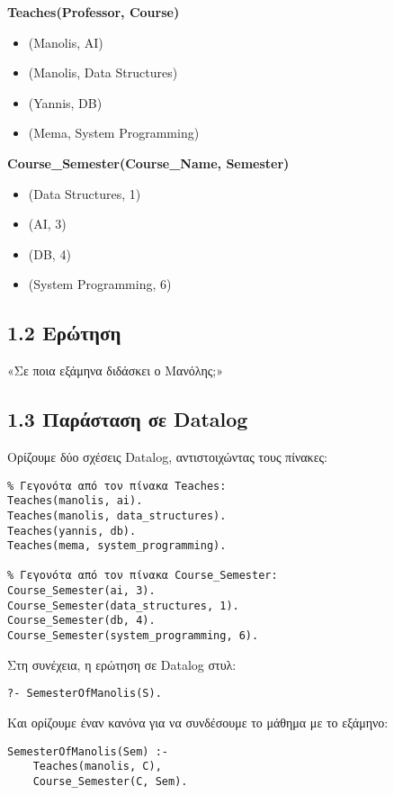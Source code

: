 \documentclass[a4paper,12pt]{article}
\begin{document}
\noindent
\textbf{Teaches(Professor, Course)} \\
\begin{itemize}
    \item (Manolis, AI)
    \item (Manolis, Data Structures)
    \item (Yannis, DB)
    \item (Mema, System Programming)
\end{itemize}

\noindent
\textbf{Course\_Semester(Course\_Name, Semester)} \\
\begin{itemize}
    \item (Data Structures, 1)
    \item (AI, 3)
    \item (DB, 4)
    \item (System Programming, 6)
\end{itemize}

\subsection*{1.2 Ερώτηση}

«Σε ποια εξάμηνα διδάσκει ο Μανόλης;»

\subsection*{1.3 Παράσταση σε Datalog}

Ορίζουμε δύο σχέσεις Datalog, αντιστοιχώντας τους πίνακες:
\begin{lstlisting}
% Γεγονότα από τον πίνακα Teaches:
Teaches(manolis, ai).
Teaches(manolis, data_structures).
Teaches(yannis, db).
Teaches(mema, system_programming).

% Γεγονότα από τον πίνακα Course_Semester:
Course_Semester(ai, 3).
Course_Semester(data_structures, 1).
Course_Semester(db, 4).
Course_Semester(system_programming, 6).
\end{lstlisting}

Στη συνέχεια, η ερώτηση σε Datalog στυλ:
\begin{lstlisting}
?- SemesterOfManolis(S).
\end{lstlisting}

Και ορίζουμε έναν κανόνα για να συνδέσουμε το μάθημα με το εξάμηνο:
\begin{lstlisting}
SemesterOfManolis(Sem) :-
    Teaches(manolis, C),
    Course_Semester(C, Sem).
\end{lstlisting}
\end{document}

